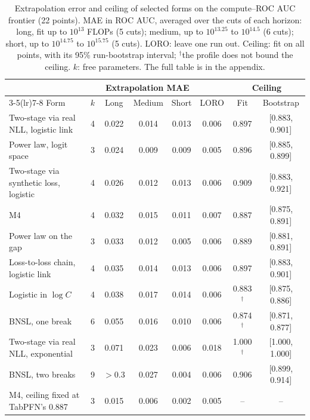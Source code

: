 \begin{table}[t]
  \centering
  \caption{Extrapolation error and ceiling of selected forms on the compute--ROC AUC frontier (22 points). MAE in ROC
  AUC, averaged over the cuts of each horizon: long, fit up to $10^{13}$ FLOPs (5 cuts); medium, up to $10^{13.25}$ to
  $10^{14.5}$ (6 cuts); short, up to $10^{14.75}$ to $10^{15.75}$ (5 cuts). LORO: leave one run out. Ceiling: fit on all
  points, with its 95\% run-bootstrap interval; $^{\dagger}$the profile does not bound the ceiling. $k$: free
  parameters. The full table is in the appendix.}
  \label{tab:forms}
  \footnotesize
  \setlength{\tabcolsep}{4pt}
  \begin{tabular}{lccccccc}
    \toprule
    & & \multicolumn{3}{c}{Extrapolation MAE} & & \multicolumn{2}{c}{Ceiling} \\
    \cmidrule(lr){3-5}\cmidrule(lr){7-8}
    Form & $k$ & Long & Medium & Short & LORO & Fit & Bootstrap \\
    \midrule
    Two-stage via real NLL, logistic link   & 4 & 0.022 & 0.014 & 0.013 & 0.006 & 0.897 & [0.883, 0.901] \\
    Power law, logit space                  & 3 & 0.024 & 0.009 & 0.009 & 0.005 & 0.896 & [0.885, 0.899] \\
    Two-stage via synthetic loss, logistic & 4 & 0.026 & 0.012 & 0.013 & 0.006 & 0.909 & [0.883, 0.921] \\
    M4                                      & 4 & 0.032 & 0.015 & 0.011 & 0.007 & 0.887 & [0.875, 0.891] \\
    Power law on the gap                    & 3 & 0.033 & 0.012 & 0.005 & 0.006 & 0.889 & [0.881, 0.891] \\
    Loss-to-loss chain, logistic link       & 4 & 0.035 & 0.014 & 0.013 & 0.006 & 0.897 & [0.883, 0.901] \\
    Logistic in $\log C$                    & 4 & 0.038 & 0.017 & 0.014 & 0.006 & 0.883$^{\dagger}$ & [0.875, 0.886] \\
    BNSL, one break                         & 6 & 0.055 & 0.016 & 0.010 & 0.006 & 0.874$^{\dagger}$ & [0.871, 0.877] \\
    Two-stage via real NLL, exponential     & 3 & 0.071 & 0.023 & 0.006 & 0.018 & 1.000$^{\dagger}$ & [1.000, 1.000] \\
    BNSL, two breaks                        & 9 & ${>}0.3$ & 0.027 & 0.004 & 0.006 & 0.906 & [0.899, 0.914] \\
    \midrule
    M4, ceiling fixed at TabPFN's 0.887     & 3 & 0.015 & 0.006 & 0.002 & 0.005 & -- & -- \\
    \bottomrule
  \end{tabular}
\end{table}

